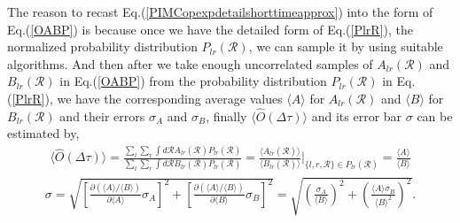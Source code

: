 \documentclass[12pt,letterpaper,UTF8]{report}
\begin{document}
The reason to recast Eq.(\ref{PIMCopexpdetailshorttimeapprox}) into the form of Eq.(\ref{OABP}) is because once we have the detailed form of Eq.(\ref{PlrR}), the normalized probability distribution $P_{lr}(\mathcal{R})$, we can sample it by using suitable algorithms.
And then after we take enough uncorrelated samples of $ A_{lr} (\mathcal{R}) $ and $ B_{lr}(\mathcal{R})$ in Eq.(\ref{OABP}) from the probability distribution $P_{lr} (\mathcal{R})$ in Eq.(\ref{PlrR}), we have the corresponding average values $\langle A \rangle$ for  $ A_{lr} (\mathcal{R}) $ and $\langle B \rangle $ for $ B_{lr}(\mathcal{R})$ and their errors $\sigma_A$ and $\sigma_B$, finally $\langle \hat{O} (\Delta \tau) \rangle$ and its error bar $\sigma$ can be estimated by,
\begin{align}
\langle \hat{O} (\Delta \tau)\rangle =
\frac{\sum_l\sum_r \int d \mathcal{R} A_{lr} (\mathcal{R}) P_{lr} (\mathcal{R}) }{ \sum_l\sum_r \int d \mathcal{R} B_{lr} (\mathcal{R}) P_{lr} (\mathcal{R})  }
=\frac{\langle A_{lr}(\mathcal{R}) \rangle }{\langle B_{lr}(\mathcal{R}) \rangle}
\bigg|_{ \{l,r,\mathcal{R}\} \in P_{lr}(\mathcal{R})  }
= \frac{\langle A \rangle}{\langle B \rangle}
\label{OABPdtave}
\end{align}
\begin{align}
\sigma =
\sqrt{ \left[ \frac{\partial (\langle A \rangle / \langle B \rangle )}{ \partial \langle A \rangle } \sigma_A \right]^2
+ \left[ \frac{\partial (\langle A \rangle / \langle B \rangle )}{ \partial \langle B \rangle } \sigma_B \right]^2  }
=
\sqrt{ \left( \frac{\sigma_A}{\langle B\rangle} \right)^2 + \left(\frac{ \langle A \rangle \sigma_B }{ \langle B \rangle^2 } \right)^2    }.
\label{OABerror}
\end{align}
\end{document}
